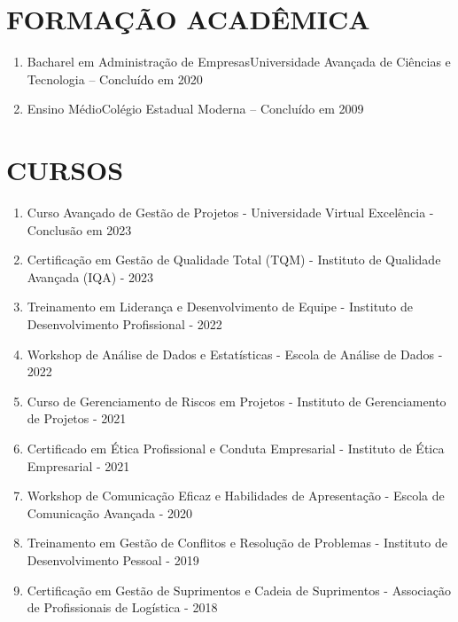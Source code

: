 \documentclass[10.5pt, a4paper]{report}
\begin{document}
\section{FORMAÇÃO ACADÊMICA}

\begin{enumerate}[label={\resizebox{0.4em}{!}{$\blacksquare$}}, leftmargin=32pt, topsep=15pt, itemsep=8pt, labelsep=10pt, align=left]
  \item Bacharel em Administração de Empresas\newline Universidade Avançada de Ciências e Tecnologia – Concluído em 2020
  \item Ensino Médio\newline Colégio Estadual Moderna – Concluído em 2009
\end{enumerate}

\section{CURSOS}
\begin{enumerate}[label={\resizebox{0.4em}{!}{$\blacksquare$}}, leftmargin=32pt, topsep=15pt, itemsep=0pt, labelsep=10pt, align=left]
  \item Curso Avançado de Gestão de Projetos - Universidade Virtual Excelência - Conclusão em 2023
  \item Certificação em Gestão de Qualidade Total (TQM) - Instituto de Qualidade Avançada (IQA) - 2023
  \item Treinamento em Liderança e Desenvolvimento de Equipe - Instituto de Desenvolvimento Profissional - 2022
  \item Workshop de Análise de Dados e Estatísticas - Escola de Análise de Dados - 2022
  \item Curso de Gerenciamento de Riscos em Projetos - Instituto de Gerenciamento de Projetos - 2021
  \item Certificado em Ética Profissional e Conduta Empresarial - Instituto de Ética Empresarial - 2021
  \item Workshop de Comunicação Eficaz e Habilidades de Apresentação - Escola de Comunicação Avançada - 2020
  \item Treinamento em Gestão de Conflitos e Resolução de Problemas - Instituto de Desenvolvimento Pessoal - 2019
  \item Certificação em Gestão de Suprimentos e Cadeia de Suprimentos - Associação de Profissionais de Logística - 2018
\end{enumerate}
\end{document}
